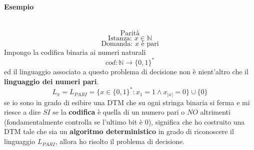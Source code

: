 \documentclass{article}
\begin{document}
\paragraph{Esempio}\mbox{}\\
$$\text{Parità}$$
$$\text{Istanza: }x\in\mathbb{N}$$
$$\text{Domanda: }x\text{ è pari}$$
Impongo la codifica binaria ai numeri naturali
$$cod:\mathbb{N}\rightarrow\{0,1\}^*$$
ed il linguaggio associato a questo problema di decisione non è nient'altro che il \textbf{linguaggio
dei numeri pari}.
$$L_\pi=L_{PARI}=\{x\in\{0,1\}^*:x_1=1\land x_{|x|}=0\}\cup\{0\}$$
se io sono in grado di esibire una DTM che su ogni stringa binaria si ferma e mi riesce a
dire $SI$ se la \textbf{codifica} è quella di un numero pari o $NO$ altrimenti (fondamentalmente
controlla se l'ultimo bit è 0), significa che ho costruito una DTM
tale che sia un \textbf{algoritmo deterministico} in grado
di riconoscere il linguaggio $L_{PARI}$, allora ho risolto il problema di decisione.
\end{document}
